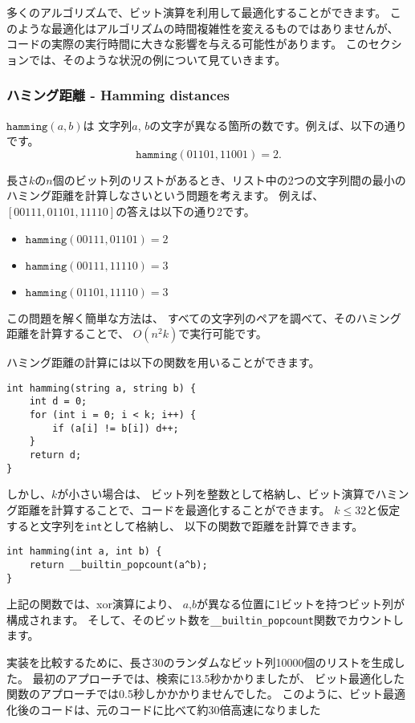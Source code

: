 多くのアルゴリズムで、ビット演算を利用して最適化することができます。
このような最適化はアルゴリズムの時間複雑性を変えるものではありませんが、
コードの実際の実行時間に大きな影響を与える可能性があります。
このセクションでは、そのような状況の例について見ていきます。

\subsubsection{ハミング距離 - Hamming distances}

$\texttt{hamming}(a,b)$は
文字列$a$, $b$の文字が異なる箇所の数です。例えば、以下の通りです。
\[\texttt{hamming}(01101,11001)=2.\]

長さ$k$の$n$個のビット列のリストがあるとき、リスト中の2つの文字列間の最小のハミング距離を計算しなさいという問題を考えます。
例えば、$[00111, 01101, 11110]$の答えは以下の通り2です。
\begin{itemize}[noitemsep]
\item $\texttt{hamming}(00111,01101)=2$
\item $\texttt{hamming}(00111,11110)=3$
\item $\texttt{hamming}(01101,11110)=3$
\end{itemize}

この問題を解く簡単な方法は、
すべての文字列のペアを調べて、そのハミング距離を計算することで、
$O(n^2 k)$で実行可能です。

ハミング距離の計算には以下の関数を用いることができます。
\begin{lstlisting}
int hamming(string a, string b) {
    int d = 0;
    for (int i = 0; i < k; i++) {
        if (a[i] != b[i]) d++;
    }
    return d;
}
\end{lstlisting}

しかし、$k$が小さい場合は、
ビット列を整数として格納し、ビット演算でハミング距離を計算することで、コードを最適化することができます。
$k \le 32$と仮定すると文字列を\texttt{int}として格納し、
以下の関数で距離を計算できます。
\begin{lstlisting}
int hamming(int a, int b) {
    return __builtin_popcount(a^b);
}
\end{lstlisting}
上記の関数では、xor演算により、
$a$,$b$が異なる位置に1ビットを持つビット列が構成されます。
そして、そのビット数を\texttt{\_\_builtin\_popcount}関数でカウントします。

実装を比較するために、長さ30のランダムなビット列10000個のリストを生成した。
最初のアプローチでは、検索に13.5秒かかりましたが、
ビット最適化した関数のアプローチでは0.5秒しかかかりませんでした。
このように、ビット最適化後のコードは、元のコードに比べて約30倍高速になりました


